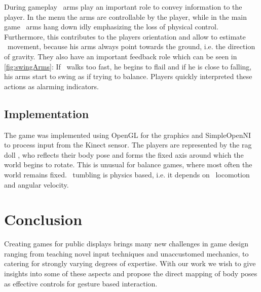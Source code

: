 \documentclass{chi-ext}
\begin{document}
During gameplay \eds\ arms play an important role to convey information to the player. In the menu the arms are controllable by the player, while in the main game \eds\ arms hang down idly emphasizing the loss of physical control. Furthermore, this contributes to the players orientation and allow to estimate \eds\ movement, because his arms always point towards the ground, i.e. the direction of gravity. They also have an important feedback role which can be seen in \autoref{fig:swingArms}: If \ed\ walks too fast, he begins to flail and if he is close to falling, his arms start to swing as if trying to balance. Players quickly interpreted these actions as alarming indicators.
\subsection{Implementation}
The game was implemented using OpenGL for the graphics and SimpleOpenNI to process input from the Kinect sensor. The players are represented by the rag doll \ed, who reflects their body pose and forms the fixed axis around which the world begins to rotate. This is unusual for balance games, where most often the world remains fixed. \eds\ tumbling is physics based, i.e. it depends on \eds\ locomotion and angular velocity.
%
\section{Conclusion}
%
Creating games for public displays brings many new challenges in game design ranging from teaching novel input techniques and unaccustomed mechanics, to catering for strongly varying degrees of expertise. With our work we wish to give insights into some of these aspects and propose the direct mapping of body poses as effective controls for gesture based interaction. 
\end{document}
